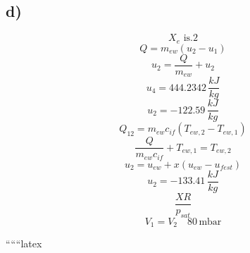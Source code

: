 

\subsection*{d)}
\[
X_e \text{ is.2}
\]
\[
Q = m_{ew} (u_2 - u_1)
\]
\[
u_2 = \frac{Q}{m_{ew}} + u_2
\]
\[
u_4 = 444.2342 \, \frac{kJ}{kg}
\]
\[
u_2 = -122.59 \, \frac{kJ}{kg}
\]
\[
Q_{12} = m_{ew} c_{if} (T_{ew,2} - T_{ew,1})
\]
\[
\frac{Q}{m_{ew} c_{if}} + T_{ew,1} = T_{ew,2}
\]
\[
u_2 = u_{ew} + x \left( u_{ew} - u_{fest} \right)
\]
\[
u_2 = -133.41 \, \frac{kJ}{kg}
\]
\[
\frac{X R}{p_{sat}}
\]
\[
V_1 = V_2 \quad 80 \, \text{mbar}
\]

``````latex